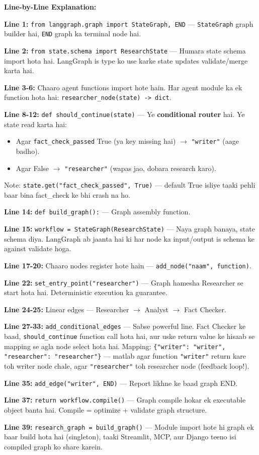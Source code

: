 \documentclass[11pt, a4paper]{article}
\begin{document}
\begin{codestorybox}
\textbf{Line-by-Line Explanation:}

\textbf{Line 1:} \texttt{from langgraph.graph import StateGraph, END} --- \texttt{StateGraph} graph builder hai, \texttt{END} graph ka terminal node hai.

\textbf{Line 2:} \texttt{from state.schema import ResearchState} --- Humara state schema import hota hai. LangGraph is type ko use karke state updates validate/merge karta hai.

\textbf{Line 3-6:} Chaaro agent functions import hote hain. Har agent module ka ek function hota hai: \texttt{researcher\_node(state) -> dict}.

\textbf{Line 8-12:} \texttt{def should\_continue(state)} --- Ye \textbf{conditional router} hai. Ye state read karta hai:
\begin{itemize}
\item Agar \texttt{fact\_check\_passed} True (ya key missing hai) $\rightarrow$ \texttt{"writer"} (aage badho).
\item Agar False $\rightarrow$ \texttt{"researcher"} (wapas jao, dobara research karo).
\end{itemize}
Note: \texttt{state.get("fact\_check\_passed", True)} --- default True isliye taaki pehli baar bina fact\_check ke bhi crash na ho.

\textbf{Line 14:} \texttt{def build\_graph():} --- Graph assembly function.

\textbf{Line 15:} \texttt{workflow = StateGraph(ResearchState)} --- Naya graph banaya, state schema diya. LangGraph ab jaanta hai ki har node ka input/output is schema ke against validate hoga.

\textbf{Line 17-20:} Chaaro nodes register hote hain --- \texttt{add\_node("naam", function)}.

\textbf{Line 22:} \texttt{set\_entry\_point("researcher")} --- Graph hamesha Researcher se start hota hai. Deterministic execution ka guarantee.

\textbf{Line 24-25:} Linear edges --- Researcher $\rightarrow$ Analyst $\rightarrow$ Fact Checker.

\textbf{Line 27-33:} \texttt{add\_conditional\_edges} --- Sabse powerful line. Fact Checker ke baad, \texttt{should\_continue} function call hota hai, aur uske return value ke hisaab se mapping se agla node select hota hai. Mapping: \texttt{\{"writer": "writer", "researcher": "researcher"\}} --- matlab agar function \texttt{"writer"} return kare toh writer node chale, agar \texttt{"researcher"} toh researcher node (feedback loop!).

\textbf{Line 35:} \texttt{add\_edge("writer", END)} --- Report likhne ke baad graph END.

\textbf{Line 37:} \texttt{return workflow.compile()} --- Graph compile hokar ek executable object banta hai. Compile = optimize + validate graph structure.

\textbf{Line 39:} \texttt{research\_graph = build\_graph()} --- Module import hote hi graph ek baar build hota hai (singleton), taaki Streamlit, MCP, aur Django teeno isi compiled graph ko share karein.
\end{codestorybox}
\end{document}
